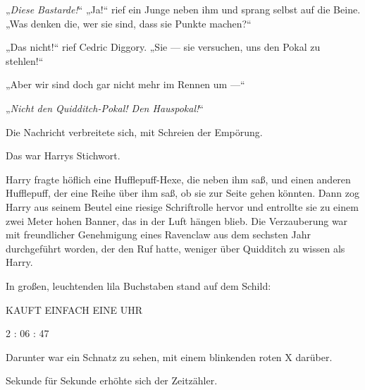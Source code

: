 „\emph{Diese Bastarde!}“
„Ja!“ rief ein Junge neben ihm und sprang selbst auf die Beine.
„Was denken die, wer sie sind, dass sie Punkte machen?“

„Das nicht!“ rief Cedric Diggory.
„Sie — sie versuchen, uns den Pokal zu stehlen!“

„Aber wir sind doch gar nicht mehr im Rennen um —“

„\emph{Nicht den Quidditch-Pokal! Den Hauspokal!}“

Die Nachricht verbreitete sich, mit Schreien der Empörung.

Das war Harrys Stichwort.

Harry fragte höflich eine Hufflepuff-Hexe, die neben ihm saß, und einen anderen Hufflepuff, der eine Reihe über ihm saß, ob sie zur Seite gehen könnten. Dann zog Harry aus seinem Beutel eine riesige Schriftrolle hervor und entrollte sie zu einem zwei Meter hohen Banner, das in der Luft hängen blieb. Die Verzauberung war mit freundlicher Genehmigung eines Ravenclaw aus dem sechsten Jahr durchgeführt worden, der den Ruf hatte, weniger über Quidditch zu wissen als Harry.

In großen, leuchtenden lila Buchstaben stand auf dem Schild:

\begin{center}
KAUFT EINFACH EINE UHR

2 : 06 : 47
\end{center}

Darunter war ein Schnatz zu sehen, mit einem blinkenden roten X darüber.

\later

Sekunde für Sekunde erhöhte sich der Zeitzähler.

